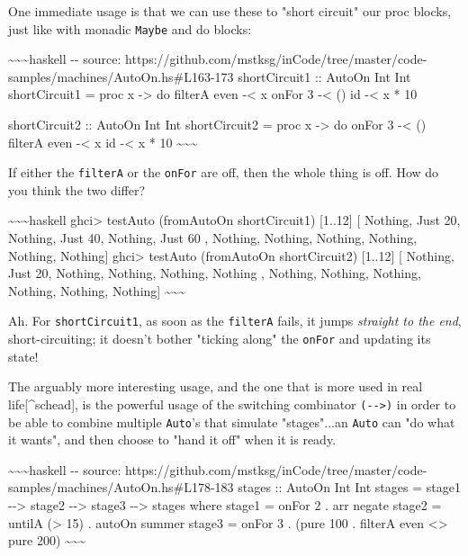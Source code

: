 \documentclass[]{article}
\begin{document}
One immediate usage is that we can use these to "short circuit" our proc blocks,
just like with monadic \texttt{Maybe} and do blocks:

\textasciitilde{}\textasciitilde{}\textasciitilde{}haskell -\/- source:
https://github.com/mstksg/inCode/tree/master/code-samples/machines/AutoOn.hs\#L163-173
shortCircuit1 :: AutoOn Int Int shortCircuit1 = proc x -\textgreater{} do
filterA even -\textless{} x onFor 3 -\textless{} () id -\textless{} x * 10

shortCircuit2 :: AutoOn Int Int shortCircuit2 = proc x -\textgreater{} do onFor
3 -\textless{} () filterA even -\textless{} x id -\textless{} x * 10
\textasciitilde{}\textasciitilde{}\textasciitilde{}

If either the \texttt{filterA} or the \texttt{onFor} are off, then the whole
thing is off. How do you think the two differ?

\textasciitilde{}\textasciitilde{}\textasciitilde{}haskell ghci\textgreater{}
testAuto (fromAutoOn shortCircuit1) {[}1..12{]} {[} Nothing, Just 20, Nothing,
Just 40, Nothing, Just 60 , Nothing, Nothing, Nothing, Nothing, Nothing,
Nothing{]} ghci\textgreater{} testAuto (fromAutoOn shortCircuit2) {[}1..12{]}
{[} Nothing, Just 20, Nothing, Nothing, Nothing, Nothing , Nothing, Nothing,
Nothing, Nothing, Nothing, Nothing{]}
\textasciitilde{}\textasciitilde{}\textasciitilde{}

Ah. For \texttt{shortCircuit1}, as soon as the \texttt{filterA} fails, it jumps
\emph{straight to the end}, short-circuiting; it doesn't bother "ticking along"
the \texttt{onFor} and updating its state!

The arguably more interesting usage, and the one that is more used in real
life{[}\^{}schead{]}, is the powerful usage of the switching combinator
\texttt{(-\/-\textgreater{})} in order to be able to combine multiple
\texttt{Auto}'s that simulate "stages"...an \texttt{Auto} can "do what it
wants", and then choose to "hand it off" when it is ready.

\textasciitilde{}\textasciitilde{}\textasciitilde{}haskell -\/- source:
https://github.com/mstksg/inCode/tree/master/code-samples/machines/AutoOn.hs\#L178-183
stages :: AutoOn Int Int stages = stage1 -\/-\textgreater{} stage2
-\/-\textgreater{} stage3 -\/-\textgreater{} stages where stage1 = onFor 2 . arr
negate stage2 = untilA (\textgreater{} 15) . autoOn summer stage3 = onFor 3 .
(pure 100 . filterA even \textless{}\textbar{}\textgreater{} pure 200)
\textasciitilde{}\textasciitilde{}\textasciitilde{}
\end{document}
